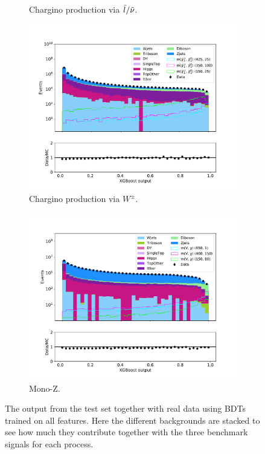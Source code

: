 \begin{figure}[H]
\begin{subfigure}[t!]{0.49\textwidth}
        \caption{Chargino production via $\Tilde{l}/\Tilde{\nu}$.}
        \label{fig:BDTdataAllSlepsnu}
    \end{subfigure}      
    \begin{subfigure}[t!]{0.49\textwidth}
        \includegraphics[width = \textwidth]{Figures/Stacked/stackedplot_BDT_All_level_WW.pdf}
        \caption{Chargino production via $W^\pm$.}
        \label{fig:BDTdataAllWW}
    \end{subfigure}
    \begin{subfigure}[t!]{0.49\textwidth}
        \includegraphics[width = \textwidth]{Figures/Stacked/stackedplot_BDT_All_level_monoZ.pdf}
        \caption{Mono-Z.}
        \label{fig:BDTdataAllmonoZ}
    \end{subfigure}
    \caption{The output from the test set together with real data using BDTs trained on all features. Here the different backgrounds are stacked to see how much they contribute together with the three benchmark signals for each process.}
    \label{fig:BDTdataAll}
\end{figure}

